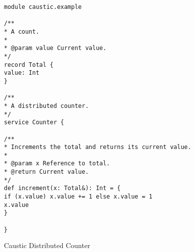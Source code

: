 \documentclass[../main.tex]{subfiles}
\begin{document}
\begin{figure}
\caption{Caustic Distributed Counter}
\begin{lstlisting}[style=Caustic]
module caustic.example

/**
* A count.
*
* @param value Current value.
*/
record Total {
value: Int
}

/**
* A distributed counter.
*/
service Counter {

/**
* Increments the total and returns its current value.
*
* @param x Reference to total.
* @return Current value.
*/
def increment(x: Total&): Int = {
if (x.value) x.value += 1 else x.value = 1
x.value
}

}
\end{lstlisting}
\label{figure:counter}
\end{figure}
\end{document}
